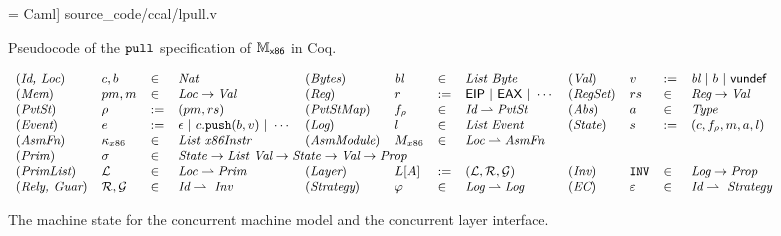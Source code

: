 \begin{figure}[t]
 = Caml] {source_code/ccal/lpull.v}
\caption{Pseudocode of the ${\mathrm{\texttt{pull}}}$ specification of $\mathbb{M}_{\mathsf{x86}}$  in Coq.}
\label{fig:exp:lpull}
\end{figure}

\begin{figure*}
\begin{center}
$
{\small
\begin{array}{llllllllllll}
(\textit{Id, Loc}) & c, b & \in &\textit{Nat}
& 
(\textit{Bytes})  &\bytelist & \in & \textit{List Byte}
&
(\textit{Val}) & v & := & \bytelist \ | \ b \ |\ \vundef
\\
 (\textit{Mem}) & pm, m & \in & \textit{Loc} \rightarrow  \textit{Val} 
&
(\textit{Reg})  &r & := & \mathsf{EIP} \ | \ \mathsf{EAX} \ | \  \cdots
& 
(\textit{RegSet}) & \regset & \in & \textit{Reg} \rightarrow \textit{Val}  
\\
(\textit{PvtSt}) & \regs & := & (pm, rs)
& 
(\textit{PvtStMap}) & f_\regs &\in & \textit{Id} \alist \textit{PvtSt}  
&
(\textit{Abs}) & a & \in & \textit{Type}  
\\ 
(\textit{Event}) & e & := & \emptye \ | \ c.\push(b,v)
\ |\  \cdots
&
(\textit{Log}) & l & \in & \textit{List}\ \textit{Event}
& 
(\textit{State}) & s & := & (c, f_\regs,m,a,l)
\\
(\textit{AsmFn}) & \kappa_{x86} & \in &  \textit{List x86Instr}  
&
(\textit{AsmModule}) & M_{x86} & \in & \textit{Loc} \partialf  \textit{AsmFn} 
 \\
(\mathit{Prim}) & \spec{} & \in & 
\multicolumn{5}{l}{
\mathit{State} \rightarrow
\textit{List Val} \rightarrow 
\mathit{State}  \rightarrow
\textit{Val} \rightarrow 
\textit{Prop}}
 \\
(\textit{PrimList}) & \Layer & \in & \textit{Loc} \alist \textit{Prim}
&
(\textit{Layer}) & L[A] & := & (\Layer, \Rely, \Guard)
 &
 (\textit{Inv}) & \codeinmath{INV} & \in & \textit{Log} \rightarrow \textit{Prop}
\\
(\textit{Rely, Guar}) & \Rely, \Guard& \in & \textit{Id} \alist\ \textit{Inv}
&
(\textit{Strategy}) & \strat{} & \in & \textit{Log} \alist \textit{Log}
&
(\textit{EC}) & \oracle & \in & \textit{Id} \alist\ \textit{Strategy}
\end{array}
}
$
\end{center}
\caption{The machine state for the concurrent machine model and the concurrent layer interface.}
\label{fig:mach:syntax}
\end{figure*}

